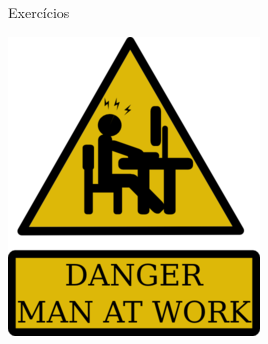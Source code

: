 \documentclass{beamer}
\begin{document}
\begin{frame}{Exercícios}
 \begin{center}
  \includegraphics[scale=0.8]{./figures/man_at_work.png}
 \end{center}
\end{frame}
\end{document}
